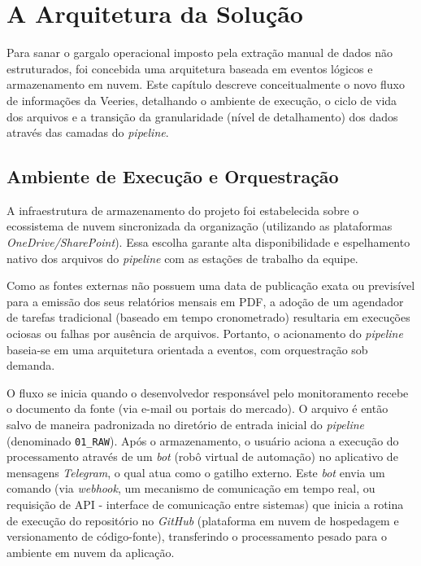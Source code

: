 \chapter{A Arquitetura da Solução} 

Para sanar o gargalo operacional imposto pela extração manual de dados não estruturados, foi concebida uma arquitetura baseada em eventos lógicos e armazenamento em nuvem. Este capítulo descreve conceitualmente o novo fluxo de informações da Veeries, detalhando o ambiente de execução, o ciclo de vida dos arquivos e a transição da granularidade (nível de detalhamento) dos dados através das camadas do \textit{pipeline}.

\section{Ambiente de Execução e Orquestração}

A infraestrutura de armazenamento do projeto foi estabelecida sobre o ecossistema de nuvem sincronizada da organização (utilizando as plataformas \textit{OneDrive/SharePoint}). Essa escolha garante alta disponibilidade e espelhamento nativo dos arquivos do \textit{pipeline} com as estações de trabalho da equipe.

Como as fontes externas não possuem uma data de publicação exata ou previsível para a emissão dos seus relatórios mensais em PDF, a adoção de um agendador de tarefas tradicional (baseado em tempo cronometrado) resultaria em execuções ociosas ou falhas por ausência de arquivos. Portanto, o acionamento do \textit{pipeline} baseia-se em uma arquitetura orientada a eventos, com orquestração sob demanda. 

O fluxo se inicia quando o desenvolvedor responsável pelo monitoramento recebe o documento da fonte (via e-mail ou portais do mercado). O arquivo é então salvo de maneira padronizada no diretório de entrada inicial do \textit{pipeline} (denominado \texttt{01\_RAW}). Após o armazenamento, o usuário aciona a execução do processamento através de um \textit{bot} (robô virtual de automação) no aplicativo de mensagens \textit{Telegram}, o qual atua como o gatilho externo. Este \textit{bot} envia um comando (via \textit{webhook}, um mecanismo de comunicação em tempo real, ou requisição de API - interface de comunicação entre sistemas) que inicia a rotina de execução do repositório no \textit{GitHub} (plataforma em nuvem de hospedagem e versionamento de código-fonte), transferindo o processamento pesado para o ambiente em nuvem da aplicação.

